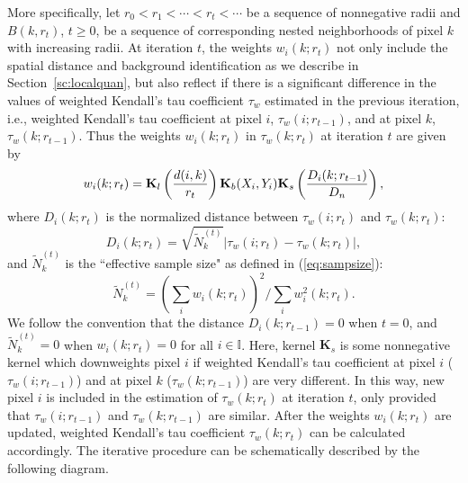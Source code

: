 \documentclass[10pt,twocolumn,twoside]{IEEEtran}
\def\II{{\mathbb I}}
\def\bK{\mathbf K}
\begin{document}
More specifically, let $r_0<r_1<\cdots<r_t<\cdots$ be a sequence of nonnegative radii and $B(k,r_t)$, $t\ge 0$, be a sequence of corresponding nested neighborhoods of pixel $k$ with increasing radii. At iteration $t$, the weights $w_i(k;r_t)$ not only include the spatial distance and background identification as we describe in Section~\ref{sc:localquan}, but also reflect if there is a significant difference in the values of weighted Kendall's tau coefficient $\tau_w$ estimated in the previous iteration, i.e., weighted Kendall's tau coefficient at pixel $i$, $\tau_w(i;r_{t-1})$, and at pixel $k$, $\tau_w(k;r_{t-1})$. Thus the weights $w_i(k;r_t)$ in $\tau_w(k;r_t)$ at iteration $t$ are given by 
\begin{equation}
\label{eq:adpwt}
w_i(k;r_t)=\bK_l\left(d(i,k)\over r_t\right) \bK_b(X_i,Y_i)\bK_s\left(D_i(k;r_{t-1}) \over D_n \right) ,
\end{equation}
where $D_i(k;r_{t})$ is the normalized distance between $\tau_w(i;r_{t})$ and $\tau_w(k;r_{t})$:
$$
D_i(k;r_{t})=\sqrt{\tilde{N}_k^{(t)}}|\tau_w(i;r_{t})-\tau_w(k;r_{t})|, 
$$
and $\tilde{N}^{(t)}_k$ is the ``effective sample size" as defined in (\ref{eq:sampsize}):
$$
\tilde{N}^{(t)}_k= \left(\sum_{i}w_i(k;r_t)\right)^2\bigg/\sum_{i}w^2_i(k;r_t).
$$
We follow the convention that the distance $D_i(k;r_{t-1})=0$ when $t=0$, and $\tilde{N}^{(t)}_k=0$ when $w_i(k;r_t)=0$ for all $i\in\II$. Here, kernel $\bK_s$ is some nonnegative kernel which downweights pixel $i$ if weighted Kendall's tau coefficient at pixel $i$ ($\tau_w(i;r_{t-1})$) and at pixel $k$ ($\tau_w(k;r_{t-1})$) are very different. In this way, new pixel $i$ is included in the estimation of $\tau_w(k;r_t)$ at iteration $t$, only provided that $\tau_w(i;r_{t-1})$ and $\tau_w(k;r_{t-1})$ are similar. After the weights $w_i(k;r_t)$ are updated, weighted Kendall's tau coefficient $\tau_w(k;r_t)$ can be calculated accordingly. The iterative procedure can be schematically described by the following diagram.
\begin{center}
\end{center}
\end{document}
